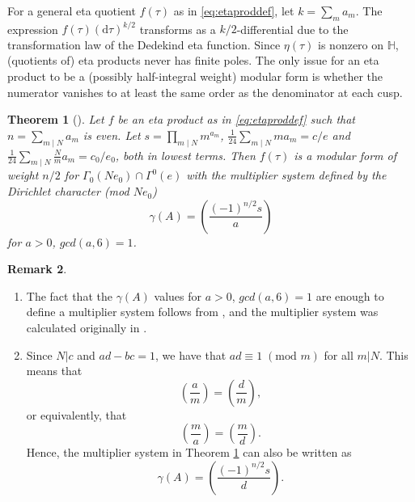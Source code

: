 \documentclass{article}
\newtheorem{theorem}{Theorem}%
\theoremstyle{definition}
\newtheorem{remark}[theorem]{Remark}
\begin{document}
For a general eta quotient $f(\tau)$ as in \eqref{eq:etaproddef}, let $k=\sum_m{a_m}$. The expression $f(\tau)(\mathrm{d}\tau)^{k/2}$ transforms as a $k/2$-differential due to the transformation law of the Dedekind eta function. Since $\eta(\tau)$ is nonzero on $\mathbb{H}$, (quotients of) eta products never has finite poles. The only issue for an eta product to be a (possibly half-integral weight) modular form is whether the numerator vanishes to at least the same order as the denominator at each cusp. 

\begin{theorem}[{\cite[Theorem 3]{gordon1993multiplicative}}] 
	\label{thm:etaprodmodeven}	
	Let $f$ be an eta product as in \eqref{eq:etaproddef} such that $n=\sum_{m \mid N} a_m$ is even. Let $s=\prod_{m \mid N} m^{a_m}$,  $\frac{1}{24}\sum_{m \mid N} ma_m=c/e$ and $\frac{1}{24}\sum_{m \mid N} \frac{N}{m}a_m=c_0/e_0$, both in lowest terms. Then $f(\tau)$ is a modular form of weight $n/2$ for $\Gamma_0(Ne_0)\cap\Gamma^0(e)$ with the multiplier system defined by the Dirichlet character (mod $Ne_0$)
	\[ \gamma(A)=\left( \frac{(-1)^{n/2} s}{a} \right) \]
	for $a>0$, $gcd(a,6)=1$.
\end{theorem}
\begin{remark}
	\label{rem:multsyst}
	\begin{enumerate}
		\item The fact that the $\gamma(A)$ values for $a>0$, $gcd(a,6)=1$ are enough to define a multiplier system follows from \cite[Lemma 3]{newman1959construction}, and the multiplier system was calculated originally in \cite[Theorem 1]{newman1959construction}.
		\item\label{it:multsyst2} Since $N|c$ and $ad-bc=1$, we have that $ad \equiv 1  \;(\textrm{mod }m)$ for all $m|N$. This means that
		\[ \left(\frac{a}{m}\right)=\left(\frac{d}{m}\right),\]
		or equivalently, that 
		\[ \left(\frac{m}{a}\right)=\left(\frac{m}{d}\right).\]
		Hence, the multiplier system in Theorem \ref{thm:etaprodmodeven} can also be written as 
		\[ \gamma(A)=\left( \frac{(-1)^{n/2} s}{d} \right). \]
	\end{enumerate}
\end{remark}
\end{document}
